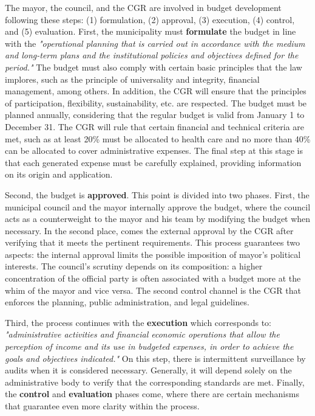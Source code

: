 The mayor, the council, and the CGR are involved in budget development following these steps: (1) formulation, (2) approval, (3) execution, (4) control, and (5) evaluation. First, the municipality must \textbf{formulate} the budget in line with the \textit{"operational planning that is carried out in accordance with the medium and long-term plans and the institutional policies and objectives defined for the period."} \parencite[p.3]{asamblea2008} The budget must also comply with certain basic principles that the law implores, such as the principle of universality and integrity, financial management, among others. In addition, the CGR will ensure that the principles of participation, flexibility, sustainability, etc. are respected. The budget must be planned annually, considering that the regular budget is valid from January 1 to December 31. The CGR will rule that certain financial and technical criteria are met, such as at least 20\% must be allocated to health care and no more than 40\% can be allocated to cover administrative expenses. The final step at this stage is that each generated expense must be carefully explained, providing information on its origin and application.

Second, the budget is \textbf{approved}. This point is divided into two phases. First, the municipal council and the mayor internally approve the budget, where the council acts as a counterweight to the mayor and his team by modifying the budget when necessary. In the second place, comes the external approval by the CGR after verifying that it meets the pertinent requirements. This process guarantees two aspects: the internal approval limits the possible imposition of mayor's political interests. The council's scrutiny depends on its composition: a higher concentration of the official party is often associated with a budget more at the whim of the mayor and vice versa. The second control channel is the CGR that enforces the planning, public administration, and legal guidelines. 

Third, the process continues with the \textbf{execution} which corresponds to: \textit{"administrative activities and financial economic operations that allow the perception of income and its use in budgeted expenses, in order to achieve the goals and objectives indicated."} \parencite[p.6]{asamblea2008} On this step, there is intermittent surveillance by audits when it is considered necessary. Generally, it will depend solely on the administrative body to verify that the corresponding standards are met. Finally, the \textbf{control} and \textbf{evaluation} phases come, where there are certain mechanisms that guarantee even more clarity within the process. 

